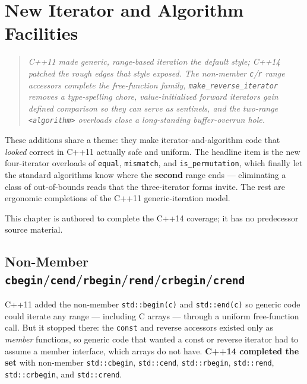\chapter{New Iterator and Algorithm Facilities}
\label{ch:c14-iterator-algorithm}

\begin{quote}
\emph{C++11 made generic, range-based iteration the default style; C++14 patched the rough edges that style exposed. The non-member \texttt{c}/\texttt{r} range accessors complete the free-function family, \texttt{make\_reverse\_iterator} removes a type-spelling chore, value-initialized forward iterators gain defined comparison so they can serve as sentinels, and the two-range \texttt{<algorithm>} overloads close a long-standing buffer-overrun hole.}
\end{quote}

These additions share a theme: they make iterator-and-algorithm code that \emph{looked} correct in C++11 actually safe and uniform. The headline item is the new four-iterator overloads of \texttt{equal}, \texttt{mismatch}, and \texttt{is\_permutation}, which finally let the standard algorithms know where the \textbf{second} range ends --- eliminating a class of out-of-bounds reads that the three-iterator forms invite. The rest are ergonomic completions of the C++11 generic-iteration model.

This chapter is authored to complete the C++14 coverage; it has no predecessor source material.

\section{Non-Member \texttt{cbegin}/\texttt{cend}/\texttt{rbegin}/\texttt{rend}/\texttt{crbegin}/\texttt{crend}}
\label{sec:c14-nonmember-accessors}

C++11 added the non-member \texttt{std::begin(c)} and \texttt{std::end(c)} so generic code could iterate any range --- including C arrays --- through a uniform free-function call. But it stopped there: the \texttt{const} and reverse accessors existed only as \emph{member} functions, so generic code that wanted a const or reverse iterator had to assume a member interface, which arrays do not have. \textbf{C++14 completed the set} with non-member \texttt{std::cbegin}, \texttt{std::cend}, \texttt{std::rbegin}, \texttt{std::rend}, \texttt{std::crbegin}, and \texttt{std::crend}.

